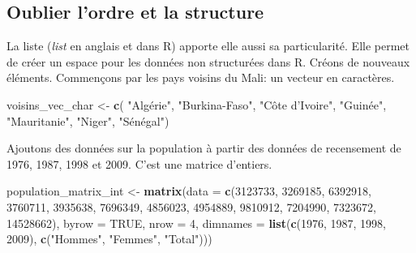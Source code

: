 \documentclass[]{book}
\newenvironment{Shaded}{\begin{snugshade}}{\end{snugshade}}
\newcommand{\KeywordTok}[1]{\textcolor[rgb]{0.13,0.29,0.53}{\textbf{#1}}}
\newcommand{\DataTypeTok}[1]{\textcolor[rgb]{0.13,0.29,0.53}{#1}}
\newcommand{\DecValTok}[1]{\textcolor[rgb]{0.00,0.00,0.81}{#1}}
\newcommand{\StringTok}[1]{\textcolor[rgb]{0.31,0.60,0.02}{#1}}
\newcommand{\OtherTok}[1]{\textcolor[rgb]{0.56,0.35,0.01}{#1}}
\newcommand{\NormalTok}[1]{#1}
\begin{document}
\subsection{Oublier l'ordre et la
structure}\label{oublier-lordre-et-la-structure}

La liste (\emph{list} en anglais et dans R) apporte elle aussi sa
particularité. Elle permet de créer un espace pour les données non
structurées dans R. Créons de nouveaux éléments. Commençons par les pays
voisins du Mali: un vecteur en caractères.

\begin{Shaded}
\begin{Highlighting}[]
\NormalTok{voisins_vec_char <-}\StringTok{ }\KeywordTok{c}\NormalTok{( }\StringTok{"Algérie"}\NormalTok{, }\StringTok{"Burkina-Faso"}\NormalTok{, }\StringTok{"Côte d'Ivoire"}\NormalTok{, }\StringTok{"Guinée"}\NormalTok{, }\StringTok{"Mauritanie"}\NormalTok{, }\StringTok{"Niger"}\NormalTok{, }\StringTok{"Sénégal"}\NormalTok{)}
\end{Highlighting}
\end{Shaded}

Ajoutons des données sur la population à partir des données de
recensement de 1976, 1987, 1998 et 2009. C'est une matrice d'entiers.

\begin{Shaded}
\begin{Highlighting}[]
\NormalTok{population_matrix_int <-}\StringTok{ }\KeywordTok{matrix}\NormalTok{(}\DataTypeTok{data =} \KeywordTok{c}\NormalTok{(}\DecValTok{3123733}\NormalTok{, }\DecValTok{3269185}\NormalTok{, }\DecValTok{6392918}\NormalTok{, }
                                         \DecValTok{3760711}\NormalTok{, }\DecValTok{3935638}\NormalTok{, }\DecValTok{7696349}\NormalTok{,}
                                         \DecValTok{4856023}\NormalTok{, }\DecValTok{4954889}\NormalTok{, }\DecValTok{9810912}\NormalTok{,}
                                         \DecValTok{7204990}\NormalTok{, }\DecValTok{7323672}\NormalTok{, }\DecValTok{14528662}\NormalTok{),}
                                \DataTypeTok{byrow =} \OtherTok{TRUE}\NormalTok{,}
                                \DataTypeTok{nrow =} \DecValTok{4}\NormalTok{,}
                                \DataTypeTok{dimnames =} \KeywordTok{list}\NormalTok{(}\KeywordTok{c}\NormalTok{(}\DecValTok{1976}\NormalTok{, }\DecValTok{1987}\NormalTok{, }\DecValTok{1998}\NormalTok{, }\DecValTok{2009}\NormalTok{), }
                                                \KeywordTok{c}\NormalTok{(}\StringTok{"Hommes"}\NormalTok{, }\StringTok{"Femmes"}\NormalTok{, }\StringTok{"Total"}\NormalTok{)))}
\end{Highlighting}
\end{Shaded}
\end{document}
